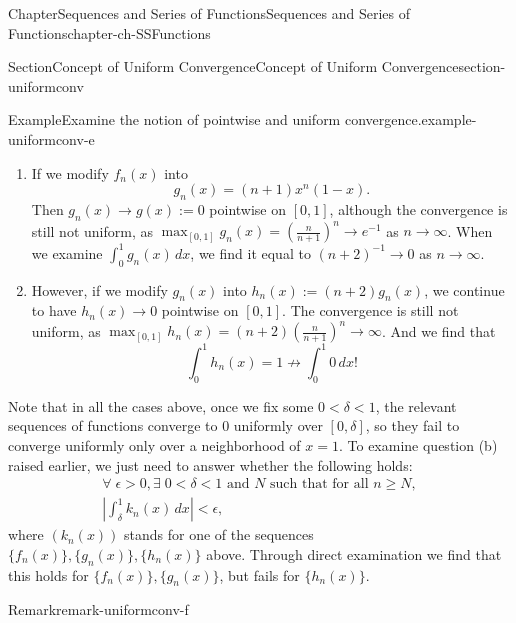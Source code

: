 \documentclass[oneside,10pt,]{book}
\numberwithin{equation}{section}
\begin{document}
\begin{chapterptx}{Chapter}{Sequences and Series of Functions}{}{Sequences and Series of Functions}{}{}{chapter-ch-SSFunctions}
\begin{sectionptx}{Section}{Concept of Uniform Convergence}{}{Concept of Uniform Convergence}{}{}{section-uniformconv}
\begin{example}{Example}{Examine the notion of pointwise and uniform convergence.}{example-uniformconv-e}
\begin{enumerate}
\begin{equation*}
\end{equation*}
fails to be continuous at \(x=1\). This is due to the failure of uniform convergence on \([0, 1]\).%
\par
Here we still have%
\begin{equation*}
\lim_{n\to \infty} \int_{0}^{1}x^{n}\, dx = \int_{0}^{1} f(x)\, dx\text{.}
\end{equation*}
%
\item{}If we modify \(f_{n}(x)\) into%
\begin{equation*}
g_{n}(x)=(n+1) x^{n}(1-x)\text{.}
\end{equation*}
Then \(g_{n}(x)\to g(x):=0\) pointwise on \([0, 1]\), although the convergence is still not uniform, as \(\max_{[0,1]}g_{n}(x)=\left(\frac{n}{n+1}\right)^{n}\to e^{-1}\) as \(n\to \infty\).  When we examine \(\int_{0}^{1}g_{n}(x)\, dx\), we find it equal to \((n+2)^{-1}\to 0\) as \(n\to \infty\).%
\item{}However, if we modify \(g_{n}(x)\) into \(h_{n}(x) :=(n+2)g_{n}(x)\), we continue to have \(h_{n}(x) \to 0\) pointwise on \([0, 1]\). The convergence is still not uniform, as \(\max_{[0,1]}h_{n}(x)= (n+2)\left(\frac{n}{n+1}\right)^{n} \to \infty\). And we find that%
\begin{equation*}
\int_{0}^{1}h_{n}(x) = 1 \not \to \int_{0}^{1} 0\, dx\text{!}
\end{equation*}
%
\end{enumerate}
Note that in all the cases above, once we fix some \(0 < \delta < 1\), the relevant sequences of functions converge to \(0\) uniformly over \([0,\delta]\), so they fail to converge uniformly only over a neighborhood of \(x=1\). To examine question (b) raised earlier, we just need to answer whether the following holds:%
\begin{gather*}
\forall \; \epsilon>0, \exists \; 0 < \delta < 1 \text{ and } N \text{ such that for all }  n\ge N,\\
\left| \int_{\delta}^{1} k_{n}(x)\, dx \right| < \epsilon,
\end{gather*}
where \((k_{n}(x))\) stands for one of the sequences  \(\{ f_{n}(x)\}, \{g_{n}(x)\}, \{h_{n}(x)\}\) above. Through direct examination we find that this holds for  \(\{f_{n}(x)\}, \{g_{n}(x)\}\), but fails for \(\{h_{n}(x)\}\).%
\end{example}
\begin{remark}{Remark}{}{remark-uniformconv-f}%

\end{remark}
\end{sectionptx}
\end{chapterptx}
\end{document}
